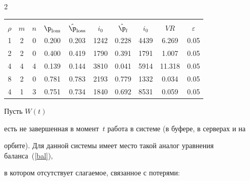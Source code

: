 \begin{multicols}{2}
\begin{table}[b]
\vspace*{-12pt}


\begin{center} 




\vspace*{2ex}





\begin{tabular}{|c|c|c|c|c|c|c|c|c|c|} 


\hline


&&&&&&&&&\\[-9pt]


 $\rho$ & $m$   &$n$   &  $\p_{\mathrm{loss}}$ & $\hat{\p}_{\mathrm{loss}}$ &  $i_0$  &


 $\hat{\p}_l$  &  $i_0$& $VR$& $\varepsilon$ \\


 \hline


1& 2& 0& 0.200& 0.203& 1242& 0.228& 4439& 6.269& 0.05\\ 


2& 2& 0& 0.400& 0.419&1790& 0.391& 1791& 1.007& 0.05\\ 


4& 4& 4& 0.139 & 0.144& 3810& 0.041& 5914&11.318& 0.05\\


8& 2& 0& 0.781& 0.783& 2193& 0.779& 1332& 0.034& 0.05\\


4& 1& 3& 0.751& 0.734& 1840& 0.692& 8531& 0.059& 0.05\\


 \hline 


 \end{tabular} 


 \end{center} 


 \end{table}





\noindent


Пусть    $W(t)$


 есть не завершенная  в момент~$t$ работа в системе (в буфере, в серверах  и на


 орбите). Для данной  сис\-те\-мы имеет место такой аналог уравнения баланса~(\ref{bal}), 


 в котором отсутствует слагаемое, связанное с потерями:



\end{multicols}
